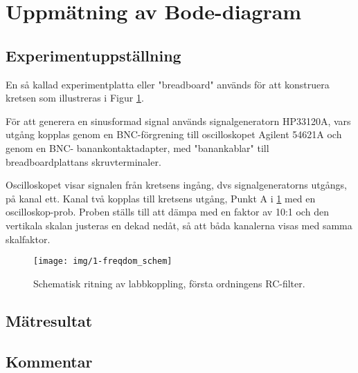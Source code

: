 %
%

\section{Uppmätning av Bode-diagram}\label{bode}

\subsection{Experimentuppställning}\label{}
En så kallad experimentplatta eller "breadboard" används för att konstruera
kretsen som illustreras i Figur \ref{fig:1-freqdom_schem}.
\par För att generera en sinusformad signal används signalgeneratorn HP33120A,
vars utgång kopplas genom en BNC-förgrening till oscilloskopet Agilent 54621A
och genom en BNC- banankontaktadapter, med "banankablar" till
breadboardplattans skruvterminaler.
\par Oscilloskopet visar signalen från kretsens ingång, dvs signalgeneratorns
utgångs, på kanal ett. Kanal två kopplas till kretsens utgång, Punkt A i
\ref{fig:1-freqdom_schem} med en oscilloskop-prob. Proben ställs till att dämpa
med en faktor av 10:1 och den vertikala skalan justeras en dekad nedåt, så att
båda kanalerna visas med samma skalfaktor.


\begin{figure}
    \centering
    \texttt{[image: img/1-freqdom\_schem]}
    \caption[Schematisk ritning av labbkoppling, första ordningens RC-filter.]
    {Schematisk ritning av labbkoppling, första ordningens RC-filter.}
    \label{fig:1-freqdom_schem}
\end{figure}


\subsection{Mätresultat}\label{}

\subsection{Kommentar}\label{}


